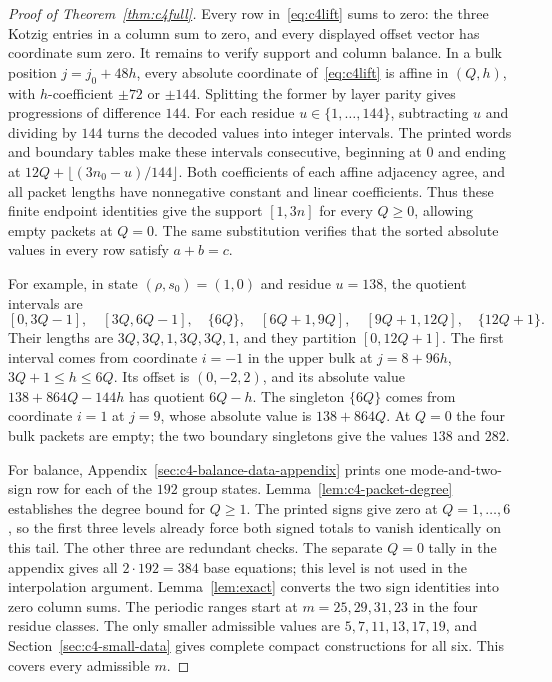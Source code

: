 \begin{proof}[Proof of Theorem~\ref{thm:c4full}]
Every row in~\eqref{eq:c4lift} sums to zero: the three Kotzig entries in a column sum to zero,
and every displayed offset vector has coordinate sum zero. It remains to verify support and column
balance.
In a bulk position $j=j_0+48h$, every absolute coordinate of~\eqref{eq:c4lift} is affine in
$(Q,h)$, with $h$-coefficient $\pm72$ or $\pm144$. Splitting the former by layer parity gives
progressions of difference $144$. For each residue $u\in\{1,\ldots,144\}$, subtracting $u$
and dividing by $144$ turns the decoded values into integer intervals. The printed words and
boundary tables make these intervals consecutive, beginning at $0$ and ending at
$12Q+\lfloor(3n_0-u)/144\rfloor$. Both coefficients of each affine adjacency agree, and all
packet lengths have nonnegative constant and linear coefficients. Thus these finite endpoint
identities give the support $[1,3n]$ for every $Q\ge0$, allowing empty packets at $Q=0$.
The same substitution verifies that the sorted absolute values in every row satisfy $a+b=c$.

For example, in state $(\rho,s_0)=(1,0)$ and residue $u=138$, the quotient intervals are
\[
 [0,3Q-1],\quad [3Q,6Q-1],\quad \{6Q\},\quad
 [6Q+1,9Q],\quad [9Q+1,12Q],\quad \{12Q+1\}.
\]
Their lengths are $3Q,3Q,1,3Q,3Q,1$, and they partition $[0,12Q+1]$.
The first interval comes from coordinate $i=-1$ in the upper bulk at
$j=8+96h$, $3Q+1\le h\le6Q$. Its offset is $(0,-2,2)$, and its absolute value
$138+864Q-144h$ has quotient $6Q-h$. The singleton $\{6Q\}$ comes from coordinate $i=1$
at $j=9$, whose absolute value is $138+864Q$.
At $Q=0$ the four bulk packets are empty; the two boundary singletons give the values $138$ and $282$.

For balance, Appendix~\ref{sec:c4-balance-data-appendix} prints one mode-and-two-sign row for each
of the $192$ group states. Lemma~\ref{lem:c4-packet-degree} establishes the degree bound for
$Q\ge1$. The printed signs give zero at $Q=1,\ldots,6$, so the first three levels already force
both signed totals to vanish identically on this tail. The other three are redundant checks.
The separate $Q=0$ tally in the appendix gives all $2\cdot192=384$ base equations;
this level is not used in the interpolation argument.
Lemma~\ref{lem:exact} converts the two sign identities into zero column sums.
The periodic ranges start at $m=25,29,31,23$ in the four residue classes. The only smaller
admissible values are $5,7,11,13,17,19$, and Section~\ref{sec:c4-small-data} gives complete compact
constructions for all six. This covers every admissible $m$.
\end{proof}

